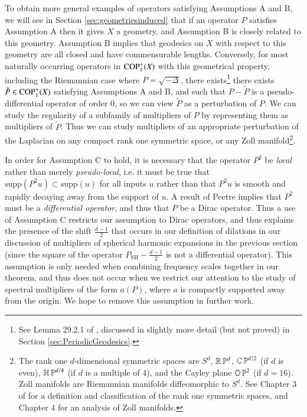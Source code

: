 To obtain more general examples of operators satisfying Assumptions A and B, we will see in Section \ref{sec:geometriesinduced} that if an operator $P$ satisfies Assumption A then it gives $X$ a geometry, and Assumption B is closely related to this geometry. Assumption B implies that geodesics on $X$ with respect to this geometry are all closed and have commensurable lengths. Conversely, for most naturally occurring operators in ${\text{COP}^{+}_{{1}}}(X)$ with this geometrical property, including the Riemannian case where $P = \sqrt{-\Delta}$, there exists\footnote{See Lemma 29.2.1 of \cite{Hormander4}, discussed in slightly more detail (but not proved) in Section \ref{sec:PeriodicGeodesics}.} there exists $\tilde{P} \in {\text{COP}^{+}_{{1}}}(X)$ satisfying Assumptions A and B, and such that $P - \tilde{P}$ is a pseudo-differential operator of order $0$, so we can view $\tilde{P}$ as a perturbation of $P$. We can study the regularity of a subfamily of multipliers of $P$ by representing them as multipliers of $\tilde{P}$. Thus we can study multipliers of an appropriate perturbation of the Laplacian on any compact rank one symmetric space, or any Zoll manifold\footnote{The rank one $d$-dimensional symmetric spaces are $S^d$, $\operatorname{\mathbb{R}} \operatorname{\mathbb{P}}^d$, $\operatorname{\mathbb{C}} \operatorname{\mathbb{P}}^{d/2}$ (if $d$ is even), $\mathbb{H} \operatorname{\mathbb{P}}^{d/4}$ (if $d$ is a multiple of $4$), and the Cayley plane $\mathbb{O} \operatorname{\mathbb{P}}^2$ (if $d = 16$). Zoll manifolds are Riemannian manifolds diffeomorphic to $S^d$. See Chapter 3 of \cite{Besse} for a definition and classification of the rank one symmetric spaces, and Chapter 4 for an analysis of Zoll manifolds.}.

In order for Assumption C to hold, it is necessary that the operator $P^2$ be \emph{local} rather than merely \emph{pseudo-local}, i.e. it must be true that $\text{supp}(P^2u) \subset \text{supp}(u)$ for all inputs $u$ rather than that $P^2u$ is smooth and rapidly decaying away from the support of $u$. A result of Peetre \cite{PeetreDiff} implies that $P^2$ must be a \emph{differential operator}, and thus that $P$ be a Dirac operator. Thus a use of Assumption C restricts our assumption to Dirac operators, and thus explains the presence of the shift $\tfrac{d-1}{2}$ that occurs in our definition of dilations in our discussion of multipliers of spherical harmonic expansions in the previous section (since the square of the operator $P_{\text{SH}} - \tfrac{d-1}{2}$ is not a differential operator). This assumption is only needed when combining frequency scales together in our theorem, and thus does not occur when we restrict our attention to the study of spectral multipliers of the form $a(P)$, where $a$ is compactly supported away from the origin. We hope to remove this assumption in further work.

